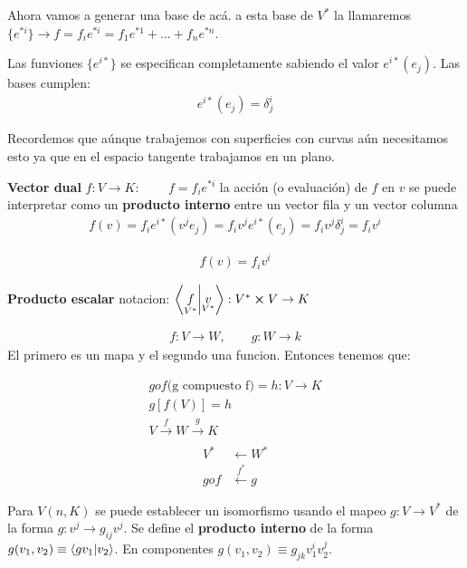 \documentclass{article}
\newcommand{\caja}[3]{%
  \begin{tcolorbox}[colback=#1!5!white,colframe=#1!25!black,title=#2]
    #3
  \end{tcolorbox}%
}
\begin{document}
Ahora vamos a generar una base de acá. a esta base de $ V ^ {* } $ la llamaremos $ \{e ^ {*i }\} \rightarrow f = f_i e ^ {*i} = f_1 e ^ {*1 } + ... + f_n e ^ {*n }$.

Las funviones $ \{e ^ {i* }\} $ se especifican completamente sabiendo el valor $ e ^ {i * }(e_j) $. Las bases cumplen: 
\begin{gather*}
  e ^ {i * }(e_j ) = \delta _{j } ^ {i }
\end{gather*}

\caja{black}{}{
  Recordemos que aúnque trabajemos con superficies con curvas aún necesitamos esto ya que en el espacio tangente trabajamos en un plano.

}

\textbf{Vector dual } $ f: V \rightarrow K  $: $ \qquad f= f_i e ^ {*i } $ la acción (o evaluación) de $ f  $ en $ v  $ se puede interpretar como un \textbf{producto interno }entre un vector fila y un vector columna 
\begin{gather*}
  f(v) = f_i e ^ {i* }(v ^ {j }e_j ) = f_i v ^ {j }e ^ {i * }(e_j ) = f_i v ^ {j }\delta_j ^i = f_i v ^ {i } 
\end{gather*}
\caja{red}{Producto interno}{
  \begin{gather*}
    f(v)= f_i v ^ {i } 
  \end{gather*}
}

\textbf{Producto escalar } notacion: $ \bra{\underset{V ^ {* }}{f}}\ket{\underset{V^* }{v }}: V ^ {* } \cross V \rightarrow K $

\caja{green}{Pullback }{
  \begin{gather*}
    f: V \rightarrow W , \qquad g: W \rightarrow k  
  \end{gather*}
  El primero es un mapa y el segundo una funcion. Entonces tenemos que: 
}
\begin{gather*}
  g o f \text{(g compuesto f)} = h : V \rightarrow K \\
  g[f(V)] = h\\
  V \overset{f}{\rightarrow }W \overset{g}{\rightarrow} K\\
\end{gather*}
\begin{align*}
  V ^ {* } &\leftarrow W ^ {* }\\
  g o f &\overset{f ^ {* } }{\leftarrow } g
\end{align*}

\caja{green}{PRoducto interno y adjunto }{
  Para $ V(n,K ) $ se puede establecer un isomorfismo usando el mapeo $ g: V \rightarrow V ^ {* } $ de la forma $ g: v ^ {j }\rightarrow g _{ij } v ^ {j } $. Se define el \textbf{producto interno } de la forma $ g(v_1,v_2) \equiv \bra{gv_1 }\ket{v_2 }  $. En componentes $ g(v_1,v_2)\equiv g _{jk } v_1 ^ {i }v_2 ^ {j } $. 
}
\end{document}
